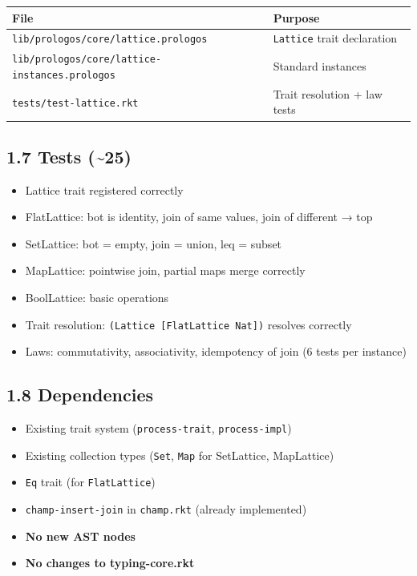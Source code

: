 \documentclass[11pt]{article}
\begin{document}
\begin{center}
\begin{tabular}{ll}
File & Purpose\\
\hline
\texttt{lib/prologos/core/lattice.prologos} & \texttt{Lattice} trait declaration\\
\texttt{lib/prologos/core/lattice-instances.prologos} & Standard instances\\
\texttt{tests/test-lattice.rkt} & Trait resolution + law tests\\
\end{tabular}
\end{center}
\subsection{1.7 Tests (\textasciitilde{}25)}
\label{sec:org80c9762}

\begin{itemize}
\item Lattice trait registered correctly
\item FlatLattice: bot is identity, join of same values, join of different → top
\item SetLattice: bot = empty, join = union, leq = subset
\item MapLattice: pointwise join, partial maps merge correctly
\item BoolLattice: basic operations
\item Trait resolution: \texttt{(Lattice [FlatLattice Nat])} resolves correctly
\item Laws: commutativity, associativity, idempotency of join (6 tests per instance)
\end{itemize}
\subsection{1.8 Dependencies}
\label{sec:org6ff2afc}

\begin{itemize}
\item Existing trait system (\texttt{process-trait}, \texttt{process-impl})
\item Existing collection types (\texttt{Set}, \texttt{Map} for SetLattice, MapLattice)
\item \texttt{Eq} trait (for \texttt{FlatLattice})
\item \texttt{champ-insert-join} in \texttt{champ.rkt} (already implemented)
\item \textbf{No new AST nodes}
\item \textbf{No changes to typing-core.rkt}
\end{itemize}
\end{document}
